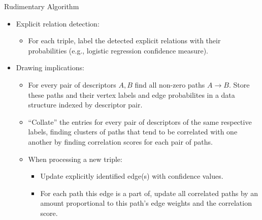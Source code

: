 \documentclass[a4paper]{article}
\begin{document}
Rudimentary Algorithm
\begin{itemize}
    \item Explicit relation detection:
    \begin{itemize}
        \item For each triple, label the detected explicit relations with their
            probabilities (e.g., logistic regression confidence measure).
    \end{itemize}
    \item Drawing implications:
    \begin{itemize}
        \item For every pair of descriptors $A, B$ find all non-zero paths $A
            \rightarrow B$. Store these paths and their vertex labels and edge
            probabilites in a data structure indexed by descriptor pair.
        \item ``Collate'' the entries for every pair of descriptors of the same
            respective labels, finding clusters of paths that tend to be
            correlated with one another by finding correlation scores for each
            pair of paths.
        \item When processing a new triple:
        \begin{itemize}
            \item Update explicitly identified edge(s) with confidence values.
            \item For each path this edge is a part of, update all correlated
                paths by an amount proportional to this path's edge weights and
                the correlation score.
        \end{itemize}
    \end{itemize}
\end{itemize}
\end{document}
